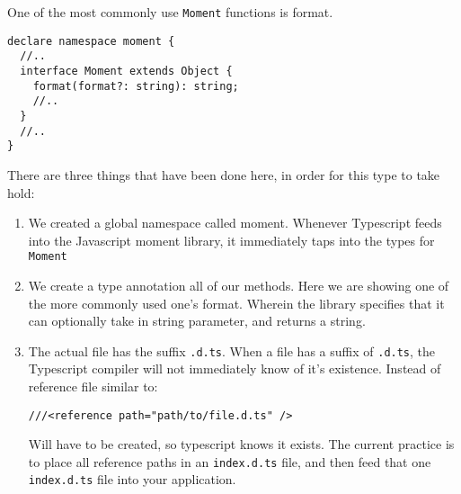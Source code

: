 One of the most commonly use \lstinline{Moment} functions is format.
\begin{lstlisting}[caption=moment.d.ts]
declare namespace moment {
  //..
  interface Moment extends Object {
    format(format?: string): string;
    //..
  }
  //..
}
\end{lstlisting}

There are three things that have been done here, in order for this type to take hold:
\begin{enumerate}
\item We created a global namespace called moment. Whenever Typescript feeds into the Javascript moment library, it immediately taps into the types for \lstinline{Moment}
\item We create a type annotation all of our methods. Here we are showing one of the more commonly used one's format. Wherein the library specifies that it can optionally take in string parameter, and returns a string.
\item The actual file has the suffix \lstinline{.d.ts}. When a file has a suffix of \lstinline{.d.ts}, the Typescript compiler will not immediately know of it's existence. Instead of reference file similar to: 
\begin{verbatim} 
///<reference path="path/to/file.d.ts" />
\end{verbatim} 
Will have to be created, so typescript knows it exists. The current practice is to place all reference paths in an \lstinline{index.d.ts} file, and then feed that one \lstinline{index.d.ts} file into your application.
\end{enumerate}